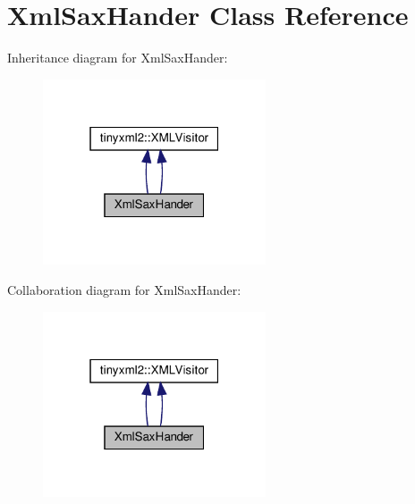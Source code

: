 \hypertarget{classXmlSaxHander}{}\section{Xml\+Sax\+Hander Class Reference}
\label{classXmlSaxHander}


Inheritance diagram for Xml\+Sax\+Hander\+:
\nopagebreak
\begin{figure}[H]
\begin{center}
\leavevmode
\includegraphics[width=187pt]{classXmlSaxHander__inherit__graph}
\end{center}
\end{figure}


Collaboration diagram for Xml\+Sax\+Hander\+:
\nopagebreak
\begin{figure}[H]
\begin{center}
\leavevmode
\includegraphics[width=187pt]{classXmlSaxHander__coll__graph}
\end{center}
\end{figure}
